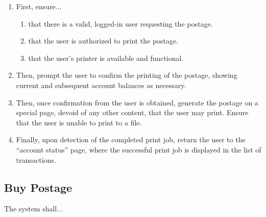 \documentclass{scrreprt}
\begin{document}
\begin{enumerate}
\item First, ensure...
\begin{enumerate}
\item that there is a valid, logged-in user requesting the postage.
\item that the user is authorized to print the postage.
\item that the user's printer is available and functional.
\end{enumerate}
\item Then, prompt the user to confirm the printing of the postage, showing
current and subsequent account balances as necessary.
\item Then, once confirmation from the user is obtained, generate the postage
on a special page, devoid of any other content, that the user may print. Ensure
that the user is unable to print to a file.
\item Finally, upon detection of the completed print job, return the user to
the ``account status'' page, where the successful print job is displayed in the
list of transactions.
\end{enumerate}

\subsection{Buy Postage}

The system shall...
\end{document}
